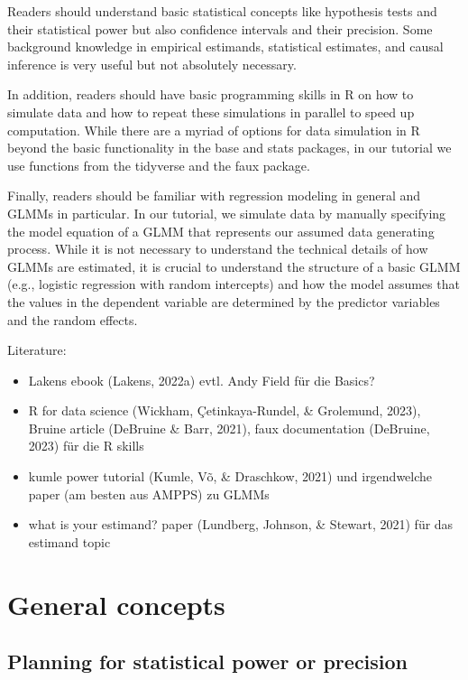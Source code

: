 \documentclass[
  man,floatsintext]{apa6}
\providecommand{\tightlist}{%
  \setlength{\itemsep}{0pt}\setlength{\parskip}{0pt}}
\begin{document}
Readers should understand basic statistical concepts like hypothesis tests and their statistical power but also confidence intervals and their precision.
Some background knowledge in empirical estimands, statistical estimates, and causal inference is very useful but not absolutely necessary.

In addition, readers should have basic programming skills in R on how to simulate data and how to repeat these simulations in parallel to speed up computation.
While there are a myriad of options for data simulation in R beyond the basic functionality in the base and stats packages, in our tutorial we use functions from the tidyverse and the faux package.

Finally, readers should be familiar with regression modeling in general and GLMMs in particular.
In our tutorial, we simulate data by manually specifying the model equation of a GLMM that represents our assumed data generating process.
While it is not necessary to understand the technical details of how GLMMs are estimated, it is crucial to understand the structure of a basic GLMM (e.g., logistic regression with random intercepts) and how the model assumes that the values in the dependent variable are determined by the predictor variables and the random effects.

Literature:

\begin{itemize}
\tightlist
\item
  Lakens ebook (Lakens, 2022a) evtl. Andy Field für die Basics?
\item
  R for data science (Wickham, Çetinkaya-Rundel, \& Grolemund, 2023), Bruine article (DeBruine \& Barr, 2021), faux documentation (DeBruine, 2023) für die R skills
\item
  kumle power tutorial (Kumle, Võ, \& Draschkow, 2021) und irgendwelche paper (am besten aus AMPPS) zu GLMMs
\item
  what is your estimand? paper (Lundberg, Johnson, \& Stewart, 2021) für das estimand topic
\end{itemize}

\hypertarget{general-concepts}{%
\section{General concepts}\label{general-concepts}}

\hypertarget{planning-for-statistical-power-or-precision}{%
\subsection{Planning for statistical power or precision}\label{planning-for-statistical-power-or-precision}}
\end{document}

